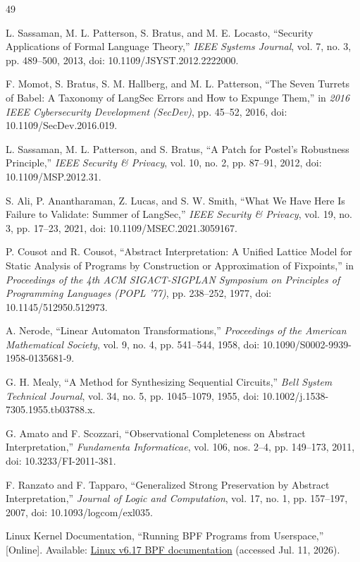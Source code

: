 \documentclass[conference]{IEEEtran}
\begin{document}
\begin{thebibliography}{49}

L. Sassaman, M. L. Patterson, S. Bratus, and M. E. Locasto, ``Security Applications of Formal Language Theory,'' \emph{IEEE Systems Journal}, vol. 7, no. 3, pp. 489--500, 2013, doi: 10.1109/JSYST.2012.2222000.

F. Momot, S. Bratus, S. M. Hallberg, and M. L. Patterson, ``The Seven Turrets of Babel: A Taxonomy of LangSec Errors and How to Expunge Them,'' in \emph{2016 IEEE Cybersecurity Development (SecDev)}, pp. 45--52, 2016, doi: 10.1109/SecDev.2016.019.

L. Sassaman, M. L. Patterson, and S. Bratus, ``A Patch for Postel's Robustness Principle,'' \emph{IEEE Security \& Privacy}, vol. 10, no. 2, pp. 87--91, 2012, doi: 10.1109/MSP.2012.31.

S. Ali, P. Anantharaman, Z. Lucas, and S. W. Smith, ``What We Have Here Is Failure to Validate: Summer of LangSec,'' \emph{IEEE Security \& Privacy}, vol. 19, no. 3, pp. 17--23, 2021, doi: 10.1109/MSEC.2021.3059167.

P. Cousot and R. Cousot, ``Abstract Interpretation: A Unified Lattice Model for Static Analysis of Programs by Construction or Approximation of Fixpoints,'' in \emph{Proceedings of the 4th ACM SIGACT-SIGPLAN Symposium on Principles of Programming Languages (POPL '77)}, pp. 238--252, 1977, doi: 10.1145/512950.512973.

A. Nerode, ``Linear Automaton Transformations,'' \emph{Proceedings of the American Mathematical Society}, vol. 9, no. 4, pp. 541--544, 1958, doi: 10.1090/S0002-9939-1958-0135681-9.

G. H. Mealy, ``A Method for Synthesizing Sequential Circuits,'' \emph{Bell System Technical Journal}, vol. 34, no. 5, pp. 1045--1079, 1955, doi: 10.1002/j.1538-7305.1955.tb03788.x.

G. Amato and F. Scozzari, ``Observational Completeness on Abstract Interpretation,'' \emph{Fundamenta Informaticae}, vol. 106, nos. 2--4, pp. 149--173, 2011, doi: 10.3233/FI-2011-381.

F. Ranzato and F. Tapparo, ``Generalized Strong Preservation by Abstract Interpretation,'' \emph{Journal of Logic and Computation}, vol. 17, no. 1, pp. 157--197, 2007, doi: 10.1093/logcom/exl035.

Linux Kernel Documentation, ``Running BPF Programs from Userspace,'' [Online]. Available: \href{https://www.kernel.org/doc/html/v6.17/bpf/bpf_prog_run.html}{Linux v6.17 BPF documentation} (accessed Jul. 11, 2026).


\end{thebibliography}
\end{document}
